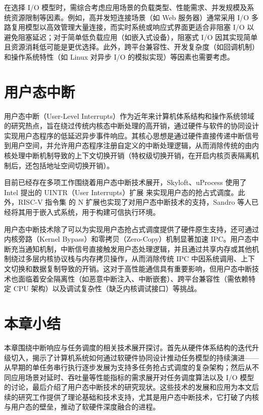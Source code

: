 在选择 I/O 模型时，需综合考虑应用场景的负载类型、性能需求、并发规模及系统资源限制等因素。例如，高并发短连接场景（如 Web 服务器）通常采用 I/O 多路复用模型以高效管理大量连接，而实时系统或响应式界面更适合非阻塞 I/O 以避免阻塞延迟；对于简单低负载应用（如嵌入式设备），阻塞式 I/O 因其实现简单且资源消耗低可能是更优选择。此外，跨平台兼容性、开发复杂度（如回调机制）和操作系统特性（如 Linux 对异步 I/O 的模拟实现）等因素也需要考虑。

\section{用户态中断}

用户态中断（User-Level Interrupts）作为近年来计算机体系结构和操作系统领域的研究热点，旨在绕过传统内核态中断处理的高开销，通过硬件与软件的协同设计实现用户态程序的低延迟异步事件响应。其核心思想是通过硬件直接传递中断信号到用户空间，并允许用户态程序注册自定义的中断处理逻辑，从而消除传统的由内核处理中断机制导致的上下文切换开销（特权级切换开销，在开启内核页表隔离机制后，还包括地址空间切换开销）。

目前已经存在多项工作围绕着用户态中断技术展开，Skyloft\cite{jia2024skyloft}、uProcess\cite{Linjiazhen2024} 使用了 Intel 提出的 UINTR（User Interrupts）扩展 \cite{x86_uintr} 来实现用户态的抢占式调度。此外，RISC-V 指令集 \cite{riscv} 的 N 扩展也实现了对用户态中断技术的支持，Sandro 等人已经将其用于嵌入式系统，用于构建可信执行环境\cite{pintouser}。

用户态中断技术除了可以为实现用户态抢占式调度提供了硬件原生支持，还可通过内核旁路（Kernel Bypass）和零拷贝（Zero-Copy）机制显著加速 IPC。用户态中断充当通知机制，中断信号直接触发用户态处理逻辑，并且通过共享内存或其他机制绕过多层内核协议栈与内存拷贝操作，从而消除传统 IPC 中因系统调用、上下文切换和数据复制导致的开销。这对于高性能通信具有重要影响，但用户态中断技术也面临着安全隔离性（如恶意中断注入、中断嵌套）、跨平台兼容性（需依赖特定 CPU 架构）以及调试复杂性（缺乏内核调试接口）等挑战。

\section{本章小结}

本章围绕中断响应与任务调度的相关技术展开探讨。首先从硬件体系结构的迭代升级切入，揭示了计算机系统如何通过软硬件协同设计推动任务模型的持续演进——从早期的单任务串行执行逐步发展为支持多任务抢占式调度的复杂架构；然后从不同应用场景对延时、吞吐量等性能指标的需求展开对任务调度算法以及 I/O 模型的讨论，最后介绍了用户态中断技术的研究现状。这些技术的发展和应用为本文后续的研究工作提供了理论基础和技术支持，尤其是用户态中断技术，它打破了内核与用户态的壁垒，推动了软硬件深度融合的进程。
